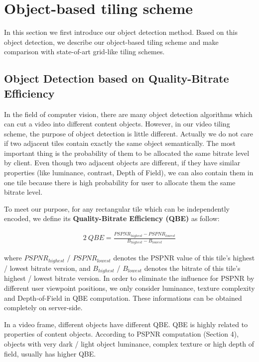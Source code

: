 \section{Object-based tiling scheme}

In this section we first introduce our object detection method. Based on this object detection, we describe our object-based tiling scheme and make comparison with state-of-art grid-like tiling schemes.

\subsection{Object Detection based on Quality-Bitrate Efficiency}

In the field of computer vision, there are many object detection algorithms which can cut a video into different content objects. However, in our video tiling scheme, the purpose of object  detection is little different. Actually we do not care if two adjacent tiles contain exactly the same object semantically. The most important thing is the probability of them to be allocated the same bitrate level by client. Even though two adjacent objects are different, if they have similar properties (like luminance, contrast, Depth of Field), we can also contain them in one tile because there is high probability for user to allocate them the same bitrate level.

To meet our purpose, for any rectangular tile which can be independently encoded, we define its \textbf{Quality-Bitrate Efficiency (QBE)} as follow:

\begin{alignat}{2}\
QBE = \frac{PSPNR_{highest} - PSPNR_{lowest}}{B_{highest} - B_{lowest}} \label{QBE}
\end{alignat}

where $PSPNR_{highest}$ / $PSPNR_{lowest}$ denotes the PSPNR value of this tile's highest / lowest bitrate version, and $B_{highest}$ / $B_{lowest}$ denotes the bitrate of this tile's highest / lowest bitrate version. In order to eliminate the influence for PSPNR by different user viewpoint positions, we only consider luminance, texture complexity and Depth-of-Field in QBE computation. These informations can be obtained completely on server-side.

In a video frame, different objects have different QBE. QBE is highly related to properties of content objects. According to PSPNR computation (Section 4), objects with very dark / light object luminance, complex texture or high depth of field, usually has higher QBE.

